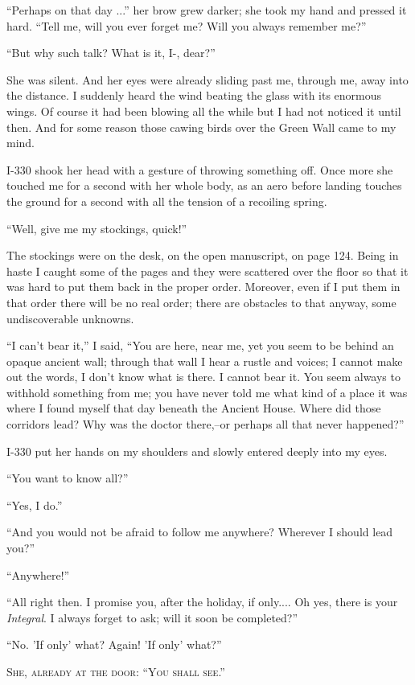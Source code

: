 \documentclass[11pt,openany]{book}
\begin{document}
``Perhaps on that day ...'' her brow grew darker; she took my hand and pressed it hard. ``Tell me, will you ever forget me? Will you always remember me?''

``But why such talk? What is it, I-, dear?''

She was silent. And her eyes were already sliding past me, through me, away into the distance. I suddenly heard the wind beating the glass with its enormous wings. Of course it had been blowing all the while but I had not noticed it until then. And for some reason those cawing birds over the Green Wall came to my mind.

I-330 shook her head with a gesture of throwing something off. Once more she touched me for a second with her whole body, as an aero before landing touches the ground for a second with all the tension of a recoiling spring.

``Well, give me my stockings, quick!''

The stockings were on the desk, on the open manuscript, on page 124. Being in haste I caught some of the pages and they were scattered over the floor so that it was hard to put them back in the proper order. Moreover, even if I put them in that order there will be no real order; there are obstacles to that anyway, some undiscoverable unknowns.

``I can't bear it,'' I said, ``You are here, near me, yet you seem to be behind an opaque ancient wall; through that wall I hear a rustle and voices; I cannot make out the words, I don't know what is there. I cannot bear it. You seem always to withhold something from me; you have never told me what kind of a place it was where I found myself that day beneath the Ancient House. Where did those corridors lead? Why was the doctor there,--or perhaps all that never happened?''

I-330 put her hands on my shoulders and slowly entered deeply into my eyes.

``You want to know all?''

``Yes, I do.''

``And you would not be afraid to follow me anywhere? Wherever I should lead you?''

``Anywhere!''

``All right then. I promise you, after the holiday, if only.... Oh yes, there is your \emph{Integral}. I always forget to ask; will it soon be completed?''

``No. 'If only' what? Again! 'If only' what?''

\begin{center}\textsc{She, already at the door: ``You shall see.''}\end{center}
\end{document}
